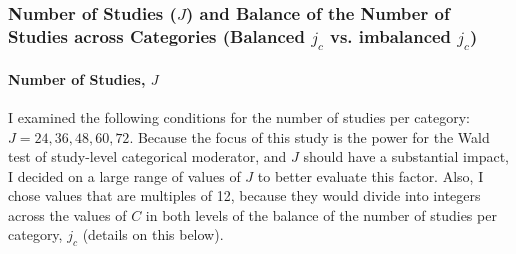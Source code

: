 





\subsubsection{Number of Studies ($J$) and Balance of the Number of Studies across Categories (Balanced $j_c$ vs. imbalanced $j_c$)}

\paragraph{Number of Studies, $J$}
I examined the following conditions for the number of studies per category: $J = 24, 36, 48, 60, 72$. Because the focus of this study is the power for the Wald test of study-level categorical moderator, and $J$ should have a substantial impact, I decided on a large range of values of $J$ to better evaluate this factor. Also, I chose values that are multiples of 12, because they would divide into integers across the values of $C$ in both levels of the balance of the number of studies per category, $j_c$ (details on this below). 

